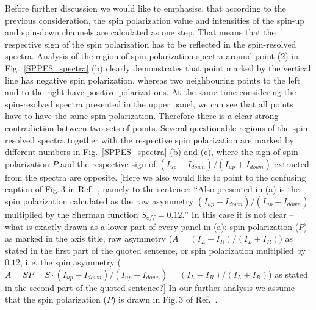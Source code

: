 \documentclass[twocolumn,preprintnumbers,amsmath,amssymb,prl]{revtex4}
\begin{document}
Before further discussion we would like to emphasise, that according to the previous consideration, the spin polarization value and intensities of the spin-up and spin-down channels are calculated as one step. That means that the respective sign of the spin polarization has to be reflected in the spin-resolved spectra. Analysis of the region of spin-polarization spectra around point (2) in Fig.~\ref{SPPES_spectra} (b) clearly demonstrates that point marked by the vertical line has negative spin polarization, whereas two neighbouring points to the left and to the right have positive polarizations. At the same time considering the spin-resolved spectra presented in the upper panel, we can see that all points have to have the same spin polarization. Therefore there is a clear strong contradiction between two sets of points. Several questionable regions of the spin-resolved spectra together with the respective spin polarization are marked by different numbers in Fig.~\ref{SPPES_spectra} (b) and (c), where the sign of spin polarization $P$ and the respective sign of $(I_{up}-I_{down})/(I_{up}+I_{down})$ extracted from the spectra are opposite. [Here we also would like to point to the confusing caption of Fig.\,3 in Ref.~, namely to the sentence: ``Also presented in (a) is the spin polarization calculated as the raw asymmetry $(I_{up} - I_{down})/(I_{up} - I_{down})$ multiplied by the Sherman function $S_{eff} = 0.12.$'' In this case it is not clear -- what is exactly drawn as a lower part of every panel in (a): spin polarization ($P$) as marked in the axis title, raw asymmetry ($A=(I_L-I_R)/(I_L+I_R)$) as stated in the first part of the quoted sentence, or spin polarization multiplied by $0.12$, i.\,e. the spin asymmetry ($A=SP=S\cdot(I_{up} - I_{down})/(I_{up} - I_{down})=(I_L-I_R)/(I_L+I_R)$) as stated in the second part of the quoted sentence?] In our further analysis we assume that the spin polarization ($P$) is drawn in Fig.\,3 of Ref.~. 
\end{document}

